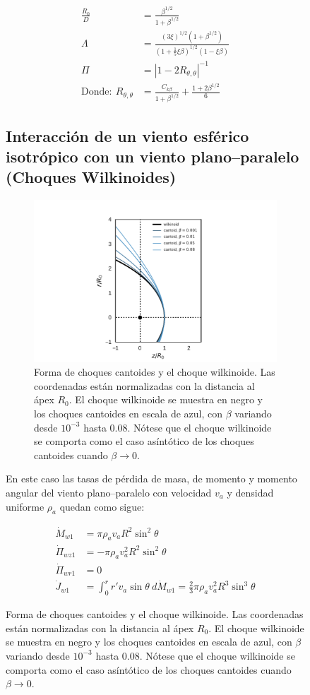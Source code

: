 \begin{figure}
\begin{align}
  \frac{R_0}{D} &= \frac{\beta^{1/2}}{1+\beta^{1/2}} \\
  \Lambda &= \frac{\left(3\xi\right)^{1/2}\left(1+\beta^{1/2}\right)}
                     {\left(1+\frac{1}{5}\xi\beta\right)^{1/2}\left(1-\xi\beta\right)} \label{eq:CRW-R90}\\
  \Pi &= \left|1 - 2R_{\theta, \theta}\right|^{-1} \label{eq:CRW-Rc}\\
  \mathrm{Donde:~} R_{\theta, \theta} &= \frac{C_{k\beta}}{1+\beta^{1/2}} + \frac{1 + 2\beta^{1/2}}{6} \label{eq:2-order}
\end{align}


\subsection{Interacción de un viento esférico isotrópico con un viento plano--paralelo (Choques Wilkinoides)}

\begin{figure}
  \includegraphics[width=0.6\linewidth]{./Figures/cantoid-wilkinoid-shape}
  \caption{Forma de choques cantoides y el choque wilkinoide. Las coordenadas están normalizadas con la distancia al ápex $R_0$. El choque wilkinoide se muestra en negro y los choques cantoides en escala de azul, con $\beta$ variando desde $10^{-3}$ hasta 0.08. Nótese que el choque wilkinoide se comporta como el caso asíntótico de los choques cantoides cuando $\beta\to 0$.}
\end{figure}


En este caso las tasas de pérdida de masa, de momento y momento angular del viento plano--paralelo con velocidad $v_a$ y densidad uniforme $\rho_a$ quedan como sigue:

\begin{align}
  \dot{M}_{w1} &= \pi \rho_a v_a R^2 \sin^2\theta\\
  \dot{\Pi}_{wz1} &= - \pi\rho_a v^2_a R^2 \sin^2\theta\\
  \dot{\Pi}_{wr1} &= 0 \\
  \dot{J}_{w1} &= \int^r_0 r'v_a \sin\theta~d\dot{M}_{w1} = \frac{2}{3}\pi\rho_a v_a^2 R^3 \sin^3\theta 
\end{align}


\end{figure}
